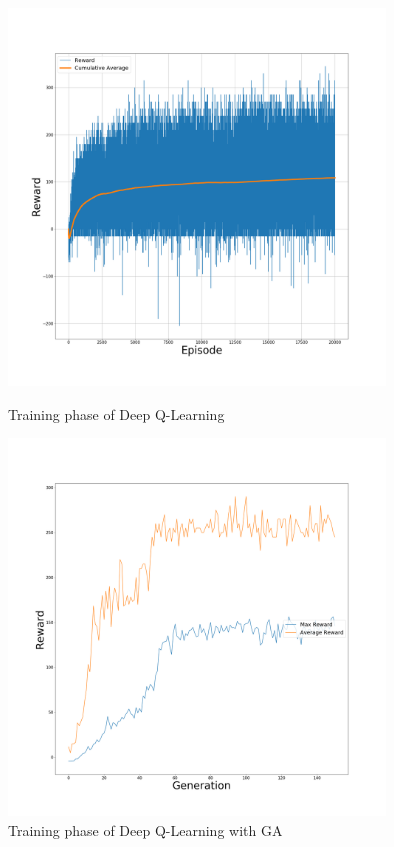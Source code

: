 \begin{figure}[!h]
	\centering
	\vspace{-2cm}
	\includegraphics[width=\linewidth,height=10cm]{./figs/deep_train.png}
	\vspace{-1cm}
	\caption{Training phase of Deep Q-Learning}
	\includegraphics[width=\linewidth,height=10cm]{./figs/deep_ga_train.png}
	\vspace{-1cm}
	\caption{Training phase of Deep Q-Learning with GA}
\end{figure}




